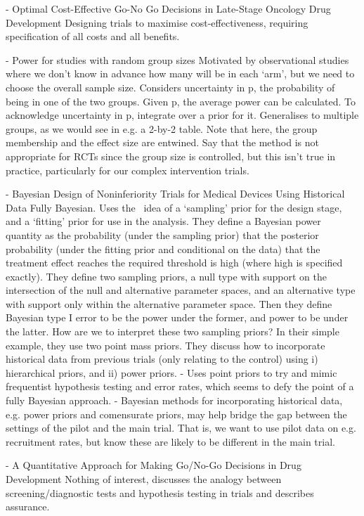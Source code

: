 \documentclass{article} %
\begin{document}
\cite{Chen2009} - Optimal Cost-Effective Go-No Go Decisions in Late-Stage Oncology Drug Development
Designing trials to maximise cost-effectiveness, requiring specification of all costs and all benefits.

\cite{Ambrosius2010} - Power for studies with random group sizes
Motivated by observational studies where we don't know in advance how many will be in each `arm', but we need to choose the overall sample size. Considers uncertainty in p, the probability of being in one of the two groups. Given p, the average power can be calculated. To acknowledge uncertainty in p, integrate over a prior for it. Generalises to multiple groups, as we would see in e.g. a 2-by-2 table. Note that here, the group membership and the effect size are entwined. Say that the method is not appropriate for RCTs since the group size is controlled, but this isn't true in practice, particularly for our complex intervention trials.

\cite{Chen2011a} - Bayesian Design of Noninferiority Trials for Medical Devices Using Historical Data
Fully Bayesian. Uses the~\cite{Wang2002} idea of a `sampling' prior for the design stage, and a `fitting' prior for use in the analysis. They define a Bayesian power quantity as the probability (under the sampling prior) that the posterior probability (under the fitting prior and conditional on the data) that the treatment effect reaches the required threshold is high (where high is specified exactly). They define two sampling priors, a null type with support on the intersection of the null and alternative parameter spaces, and an alternative type with support only within the alternative parameter space. Then they define Bayesian type I error to be the power under the former, and power to be under the latter. How are we to interpret these two sampling priors? In their simple example, they use two point mass priors. They discuss how to incorporate historical data from previous trials (only relating to the control) using i) hierarchical priors, and ii) power priors.
- Uses point priors to try and mimic frequentist hypothesis testing and error rates, which seems to defy the point of a fully Bayesian approach.
- Bayesian methods for incorporating historical data, e.g. power priors and comensurate priors, may help bridge the gap between the settings of the pilot and the main trial. That is, we want to use pilot data on e.g. recruitment rates, but know these are likely to be different in the main trial.

\cite{Chuang-Stein2011} - A Quantitative Approach for Making Go/No-Go Decisions in Drug Development
Nothing of interest, discusses the analogy between screening/diagnostic tests and hypothesis testing in trials and describes assurance.
\end{document}
